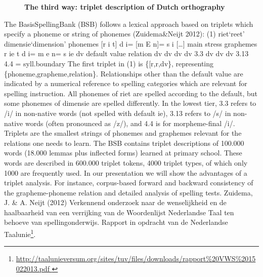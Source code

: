 \documentclass[10pt, a4paper, twopage, headinclude, footinclude, BCOR5mm]{book}
\begin{document}
\newpage

\begin{figure}[t!]
\centering
\large\textbf{The third way: triplet description of Dutch orthography}
\vspace*{0.5cm}
\end{figure}


\begin{table}[t!]
\end{table} 
\noindent
The BasisSpellingBank (BSB) follows a lexical approach based on triplets which specify a phoneme or string of phonemes (Zuidema\&Neijt 2012): (1)		riet‘reet’		dimensie‘dimension’	 	phonemes	[r	i	t]		d	i=	[m	E	n]=	s	i	[…]	 main stress 	graphemes	r	ie	t		d	i=	m	e	n=	s	ie	dv	default value 	relation	dv	dv	dv		dv	3.3	dv	dv	dv	3.13	4.4	=	syll.boundary The first triplet in (1) is \{[r,r,dv\}, representing \{phoneme,grapheme,relation\}. Relationships other than the default value are indicated by a numerical reference to spelling categories which are relevant for spelling instruction. All phonemes of riet are spelled according to the default, but some phonemes of dimensie are spelled differently. In the lowest tier, 3.3 refers to /i/ in non-native words (not spelled with default ie), 3.13 refers to /s/ in non-native words (often pronounced as /z/), and 4.4 is for morpheme-final /i/. Triplets are the smallest strings of phonemes and graphemes relevant for the relations one needs to learn. 	The BSB contains triplet descriptions of 100.000 words (18.000 lemmas plus inflected forms) learned at primary school. These words are described in 600.000 triplet tokens, 4000 triplet types, of which only 1000 are frequently used. In our presentation we will show the advantages of a triplet analysis. For instance, corpus-based forward and backward consistency of the grapheme-phoneme relation and detailed analysis of spelling tests.  Zuidema, J. \& A. Neijt (2012) Verkennend onderzoek naar de wenselijkheid en de haalbaarheid van een verrijking van de Woordenlijst Nederlandse Taal ten behoeve van spellingonderwijs. Rapport in opdracht van de Nederlandse Taalunie\footnote{\url{ http://taalunieversum.org/sites/tuv/files/downloads/rapport\%20VWS\%2015022013.pdf }}.  
\end{document}
